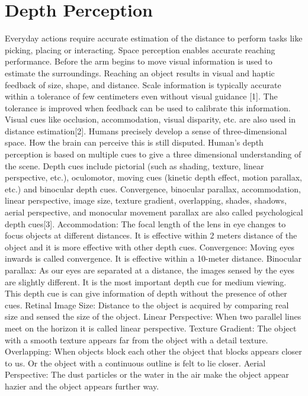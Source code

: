 \section{Depth Perception}
Everyday actions require accurate estimation of the distance to perform tasks like picking, placing or interacting. Space perception enables accurate reaching performance. Before the arm begins to move visual information is used to estimate the surroundings. Reaching an object results in visual and haptic feedback of size, shape, and distance. Scale information is typically accurate within a tolerance of few centimeters even without visual guidance [1]. The tolerance is improved when feedback can be used to calibrate this information. Visual cues like occlusion, accommodation, visual disparity, etc. are also used in distance estimation[2].
Humans precisely develop a sense of three-dimensional space. How the brain can perceive this is still disputed. Human's depth perception is based on multiple cues to give a three dimensional understanding of the scene. Depth cues include pictorial (such as shading, texture, linear perspective, etc.), oculomotor, moving cues (kinetic depth effect, motion parallax, etc.) and binocular depth cues. Convergence, binocular parallax, accommodation, linear perspective, image size, texture gradient, overlapping, shades, shadows, aerial perspective, and monocular movement parallax are also called psychological depth cues[3].
Accommodation: The focal length of the lens in eye changes to focus objects at different distances. It is effective within 2 meters distance of the object and it is more effective with other depth cues.
Convergence: Moving eyes inwards is called convergence. It is effective within a 10-meter distance. Binocular parallax: As our eyes are separated at a distance, the images sensed by the eyes are slightly different. It is the most important depth cue for medium viewing. This depth cue is can give information of depth without the presence of other cues.
Retinal Image Size: Distance to the object is acquired by comparing real size and sensed the size of the object.
Linear Perspective: When two parallel lines meet on the horizon it is called linear perspective.
Texture Gradient: The object with a smooth texture appears far from the object with a detail texture. 
Overlapping: When objects block each other the object that blocks appears closer to us. Or the object with a continuous outline is felt to lie closer. 
Aerial Perspective: The dust particles or the water in the air make the object appear hazier and the object appears further way.
